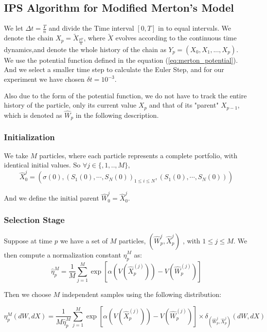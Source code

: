 \subsection{IPS Algorithm for Modified Merton's Model}
We let $\Delta t = \frac{T}{n}$ and divide the Time interval $[0,T]$ in to equal 
intervals. We denote the chain $X_p = \tilde{X}_{\frac{pT}{n}}$, where $\tilde{X}$ 
evolves according to the continuous time dynamics,and denote the whole history of 
the chain as $Y_{p} =(X_{0},X_{1},...,X_{p})$. We use the potential function 
defined in the equation (\ref{eq:merton_potential}). And we select a smaller 
time step to calculate the Euler Step, and for our experiment we have chosen 
$\delta t = 10^{-3}$.

Also due to the form of the potential function, we do not have to track the 
entire history of the particle, only its current value $X_p$ and that of its 
"parent" $X_{p-1}$, which is denoted as $\hat{W}_p$ in the following description.

\subsubsection{Initialization}
We take $M$ particles, where each particle represents a complete portfolio, 
with identical initial values. So $\forall j \in \{,1,..,M\},$
\begin{equation}
	\hat{X}_0^{j} = \left( \sigma(0), \left( S_1(0), \cdots, S_N(0) \right)_{1 \leq i \leq N} , 
	\left( S_1(0), \cdots, S_N(0) \right) \right)
\end{equation}

And we define the initial parent $\hat{W}_0^{j}=\hat{X}_0^{j}$.

\subsubsection{Selection Stage}
Suppose at time $p$ we have a set of $M$ particles, $(\hat{W}_p^{j},\hat{X}_p^{j})$
, with $1 \leq j \leq M$. We then compute a normalization constant $\hat{\eta}_{p}^{M}$ as:
\begin{equation}
	\hat{\eta}_{p}^{M} = \frac{1}{M} \sum_{j=1}^{M} \exp \left[ \alpha \left( 
	V(\hat{X}_{p}^{(j)}) \right) - V(\hat{W}^{(j)}_{p}) \right]
\end{equation}

Then we choose $M$ independent samples using the following distribution:

\begin{equation}
	\eta_{p}^{M} (dW,dX) = \frac{1}{M \hat{\eta}_{p}^{M}} \sum_{j=1}^{M} 
	\exp \left[ \alpha \left( V(\hat{X}_{p}^{(j)}) \right) - V(\hat{W}^{(j)}_{p}) 
	\right] \times \delta_{(\hat{W}_p^{j},\hat{X}_p^{j})} (dW,dX)
\end{equation}

